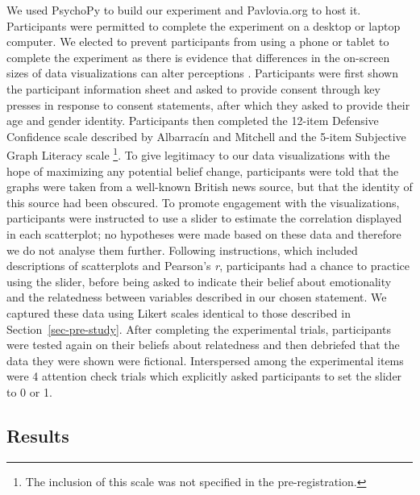 \documentclass[manuscript,screen,review,anonymous]{acmart}
\begin{document}
We used PsychoPy \citep{pierce_2019} to build our experiment and
Pavlovia.org to host it. Participants were permitted to complete the
experiment on a desktop or laptop computer. We elected to prevent
participants from using a phone or tablet to complete the experiment as
there is evidence that differences in the on-screen sizes of data
visualizations can alter perceptions \citep{cleveland_1982}.
Participants were first shown the participant information sheet and
asked to provide consent through key presses in response to consent
statements, after which they asked to provide their age and gender
identity. Participants then completed the 12-item Defensive Confidence
scale described by Albarracín and Mitchell \citep{albarracin_2004} and
the 5-item Subjective Graph Literacy scale \citep{garcia_2016}
\footnote{The inclusion of this scale was not specified in the
  pre-registration.}. To give legitimacy to our data visualizations with
the hope of maximizing any potential belief change, participants were
told that the graphs were taken from a well-known British news source,
but that the identity of this source had been obscured. To promote
engagement with the visualizations, participants were instructed to use
a slider to estimate the correlation displayed in each scatterplot; no
hypotheses were made based on these data and therefore we do not analyse
them further. Following instructions, which included descriptions of
scatterplots and Pearson's \emph{r}, participants had a chance to
practice using the slider, before being asked to indicate their belief
about emotionality and the relatedness between variables described in
our chosen statement. We captured these data using Likert scales
identical to those described in Section~\ref{sec-pre-study}. After
completing the experimental trials, participants were tested again on
their beliefs about relatedness and then debriefed that the data they
were shown were fictional. Interspersed among the experimental items
were 4 attention check trials which explicitly asked participants to set
the slider to 0 or 1.

\subsection{Results}\label{sec-results-main}
\end{document}
